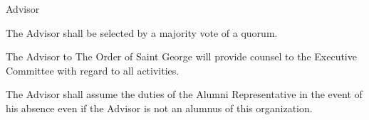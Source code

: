 {
\begin{article}{Advisor}
	\item The Advisor shall be selected by a majority vote of a quorum.
	\item The Advisor to The Order of Saint George will provide counsel to the Executive Committee with regard to all activities.
	\item The Advisor shall assume the duties of the Alumni Representative in the event of his absence even if the Advisor is not an alumnus of this organization.
\end{article}
}